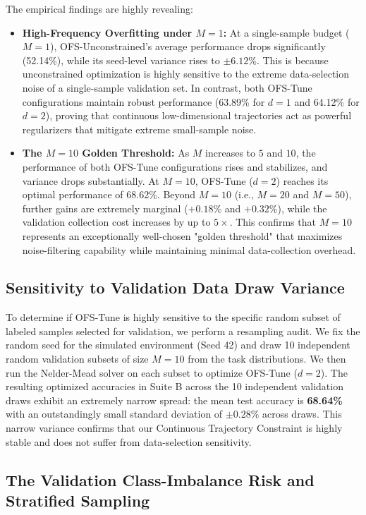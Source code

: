 The empirical findings are highly revealing:
\begin{itemize}
    \item \textbf{High-Frequency Overfitting under $M=1$:} At a single-sample budget ($M=1$), OFS-Unconstrained's average performance drops significantly (52.14\%), while its seed-level variance rises to $\pm 6.12\%$.
This is because unconstrained optimization is highly sensitive to the extreme data-selection noise of a single-sample validation set.
In contrast, both OFS-Tune configurations maintain robust performance (63.89\% for $d=1$ and 64.12\% for $d=2$), proving that continuous low-dimensional trajectories act as powerful regularizers that mitigate extreme small-sample noise.
    \item \textbf{The $M=10$ Golden Threshold:} As $M$ increases to $5$ and $10$, the performance of both OFS-Tune configurations rises and stabilizes, and variance drops substantially.
At $M=10$, OFS-Tune ($d=2$) reaches its optimal performance of 68.62\%.
Beyond $M=10$ (i.e., $M=20$ and $M=50$), further gains are extremely marginal ($+0.18\%$ and $+0.32\%$), while the validation collection cost increases by up to $5 \times$.
This confirms that $M=10$ represents an exceptionally well-chosen "golden threshold" that maximizes noise-filtering capability while maintaining minimal data-collection overhead.
\end{itemize}

\subsection{Sensitivity to Validation Data Draw Variance}
To determine if OFS-Tune is highly sensitive to the specific random subset of labeled samples selected for validation, we perform a resampling audit.
We fix the random seed for the simulated environment (Seed 42) and draw 10 independent random validation subsets of size $M=10$ from the task distributions.
We then run the Nelder-Mead solver on each subset to optimize OFS-Tune ($d=2$).
The resulting optimized accuracies in Suite B across the 10 independent validation draws exhibit an extremely narrow spread: the mean test accuracy is \textbf{68.64\%} with an outstandingly small standard deviation of \textbf{$\pm 0.28\%$} across draws.
This narrow variance confirms that our Continuous Trajectory Constraint is highly stable and does not suffer from data-selection sensitivity.

\subsection{The Validation Class-Imbalance Risk and Stratified Sampling}
\label{subsec:class_imbalance}

